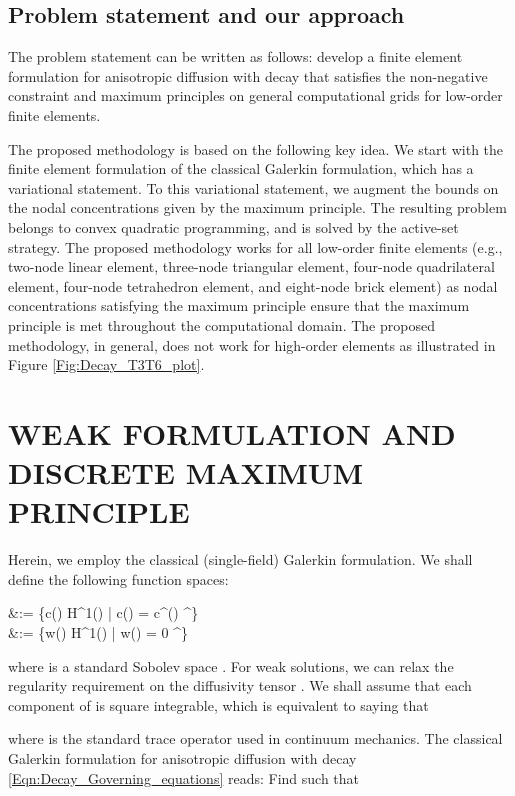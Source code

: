 \documentclass[11pt]{amsart}
\begin{document}
\subsection{Problem statement and our approach}
The problem statement can be written as follows: develop a finite element formulation 
for anisotropic diffusion with decay that satisfies the non-negative constraint and 
maximum principles on general computational grids for low-order finite elements. 

The proposed methodology is based on the following key idea. We start with the finite 
element formulation of the classical Galerkin formulation, which has a variational 
statement. To this variational statement, we augment the bounds on the nodal concentrations 
given by the maximum principle. The resulting problem belongs to convex quadratic programming, 
and is solved by the active-set strategy. The proposed methodology works for all low-order 
finite elements (e.g., two-node linear element, three-node triangular element, four-node 
quadrilateral element, four-node tetrahedron element, and eight-node brick element) as 
nodal concentrations satisfying the maximum principle ensure that the maximum principle 
is met throughout the computational domain. The proposed methodology, in general, does 
not work for high-order elements as illustrated in Figure \ref{Fig:Decay_T3T6_plot}.
 
\section{WEAK FORMULATION AND DISCRETE MAXIMUM PRINCIPLE}
\label{Sec:Decay_Nonnegative}
Herein, we employ the classical (single-field) Galerkin formulation. We shall 
define the following function spaces:

     &:= \left\{c() \in H^{1}(\Omega) \; \big| \; c() = 
      c^{}() \;  \; \Gamma^{}\right\} \\
     &:= \left\{w() \in H^{1}(\Omega) \; \big| \; w() = 0 
      \;  \; \Gamma^{}\right\} 
  
where  is a standard Sobolev space \cite{Brezzi_Fortin}. For weak solutions, 
we can relax the regularity requirement on the diffusivity tensor . 
We shall assume that  each component of  is square integrable, which 
is equivalent to saying that 

where  is the standard trace operator \cite{Chadwick} used in 
continuum mechanics. The classical Galerkin formulation for anisotropic diffusion 
with decay \eqref{Eqn:Decay_Governing_equations} reads: Find  such that 
\end{document}
